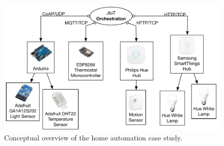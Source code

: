 \begin{figure}[t]
  \centering
  \includegraphics[width=\textwidth]{case_study_overview.pdf}
  \caption{Conceptual overview of the home automation case study.} 
  \label{fig:case_study_overview} \end{figure}

